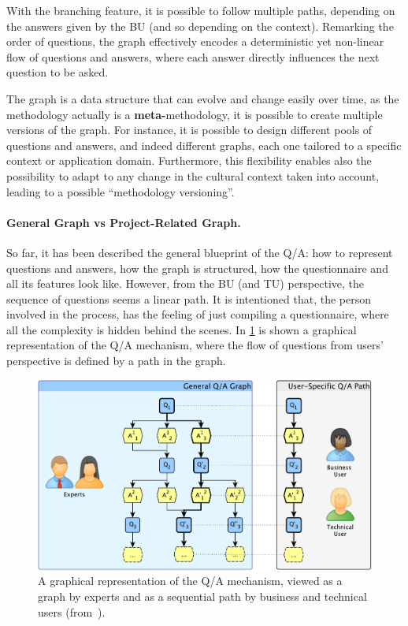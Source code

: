 \documentclass[12pt,a4paper,openright,twoside]{book}
\begin{document}
With the branching feature, it is possible to follow multiple paths, depending on the answers given by the \acf{BU} (and so depending on the context).
%
Remarking the order of questions, the graph effectively encodes a deterministic yet non-linear flow of questions and answers, where each answer directly influences the next question to be asked.

The graph is a data structure that can evolve and change easily over time, as the methodology actually is a \textbf{meta-}methodology, it is possible to create multiple versions of the graph.
%
For instance, it is possible to design different pools of questions and answers, and indeed different graphs, each one tailored to a specific context or application domain.
%
Furthermore, this flexibility enables also the possibility to adapt to any change in the cultural context taken into account, leading to a possible ``methodology versioning''.

\paragraph{General Graph vs Project-Related Graph.}
So far, it has been described the general blueprint of the \ac{Q/A}: how to represent questions and answers, how the graph is structured, how the questionnaire and all its features look like.
%
However, from the \acl{BU} (and \acl{TU}) perspective, the sequence of questions seems a linear path.
%
It is intentioned that, the person involved in the process, has the feeling of just compiling a questionnaire, where all the complexity is hidden behind the scenes.
%
In \cref{fig:qa-graph-path} is shown a graphical representation of the \ac{Q/A} mechanism, where the flow of questions from users' perspective is defined by a path in the graph.

\begin{figure}
    \centering
    \includegraphics[width=\linewidth]{figures/qa-graph-path.pdf}
    \caption{
        A graphical representation of the \ac{Q/A} mechanism, viewed as a graph by experts and as a sequential path by business and technical users (from~\cite{hicssfairness2025}).
    }
    \label{fig:qa-graph-path}
\end{figure}
\end{document}
